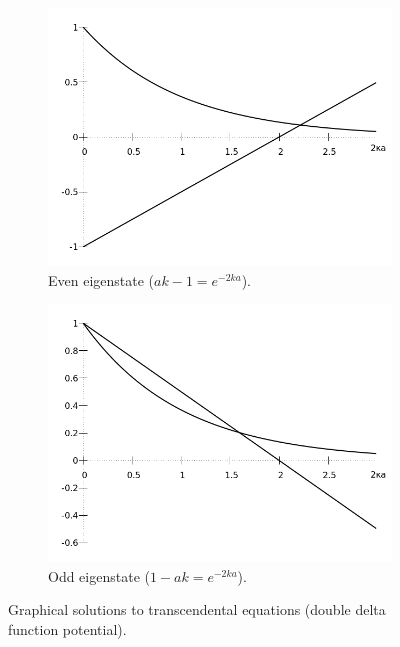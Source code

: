 \documentclass[a4paper,12pt]{article}
\begin{document}
\begin{figure}
  \centering
  \begin{subfigure}[h]{0.48\textwidth}
    \includegraphics[width=\textwidth]{even_solution.png}
    \caption{Even eigenstate ($ak-1=e^{-2ka}$).}
  \end{subfigure}
  \begin{subfigure}[h]{0.48\textwidth}
    \includegraphics[width=\textwidth]{odd_solution.png}
    \caption{Odd eigenstate ($1-ak=e^{-2ka}$).}
  \end{subfigure}
  \caption{Graphical solutions to transcendental equations (double delta function potential).}
\end{figure}
\end{document}
